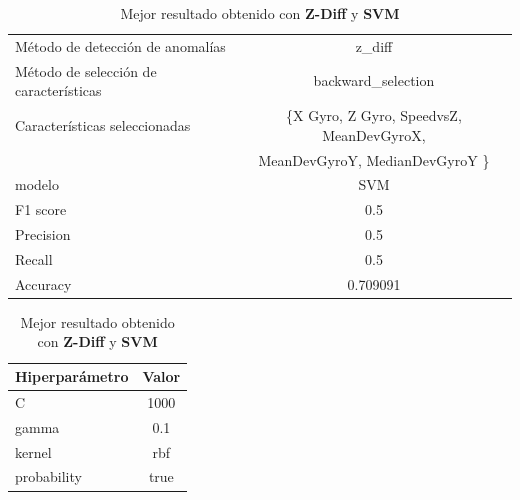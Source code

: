 \begin{appendices}
		\begin{table}[htb]
			\centering
			\caption{Mejor resultado obtenido con \textbf{Z-Diff} y \textbf{SVM}}
			\label{table:26}
			\begin{tabular}{lc}
				\toprule
					  Método de detección de anomalías &                                             z\_diff \\
				Método de selección de características &                                 backward\_selection \\
						 Características seleccionadas & \{X Gyro, Z Gyro, SpeedvsZ, MeanDevGyroX, \\
						 							   &      MeanDevGyroY, MedianDevGyroY \} \\
												modelo &                                                SVM \\
											  F1 score &                                                0.5 \\
											 Precision &                                                0.5 \\
												Recall &                                                0.5 \\
											  Accuracy &                                           0.709091 \\
				\bottomrule
				\end{tabular}
			\newline
			\newline

			\begin{tabular}{lc}
			\toprule
			Hiperparámetro & Valor \\
			\midrule
						 C &  1000 \\
					 gamma &   0.1 \\
					kernel &   rbf \\
			   probability &  true \\
			\bottomrule
			\end{tabular}
			
		\end{table}

		\begin{table}[htb]
			\centering
			\caption{Mejor resultado obtenido con \textbf{DBSCAN} y \textbf{SVM}}
			\label{table:27}


\end{table}
\end{appendices}
